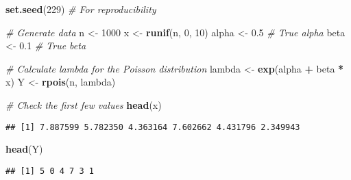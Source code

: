 \documentclass[
]{article}
\newenvironment{Shaded}{\begin{snugshade}}{\end{snugshade}}
\newcommand{\CommentTok}[1]{\textcolor[rgb]{0.56,0.35,0.01}{\textit{#1}}}
\newcommand{\DecValTok}[1]{\textcolor[rgb]{0.00,0.00,0.81}{#1}}
\newcommand{\FloatTok}[1]{\textcolor[rgb]{0.00,0.00,0.81}{#1}}
\newcommand{\FunctionTok}[1]{\textcolor[rgb]{0.13,0.29,0.53}{\textbf{#1}}}
\newcommand{\NormalTok}[1]{#1}
\newcommand{\OtherTok}[1]{\textcolor[rgb]{0.56,0.35,0.01}{#1}}
\newcommand{\SpecialCharTok}[1]{\textcolor[rgb]{0.81,0.36,0.00}{\textbf{#1}}}
\begin{document}
\begin{Shaded}
\begin{Highlighting}[]
\FunctionTok{set.seed}\NormalTok{(}\DecValTok{229}\NormalTok{) }\CommentTok{\# For reproducibility}

\CommentTok{\# Generate  data}
\NormalTok{n }\OtherTok{\textless{}{-}} \DecValTok{1000} 
\NormalTok{x }\OtherTok{\textless{}{-}} \FunctionTok{runif}\NormalTok{(n, }\DecValTok{0}\NormalTok{, }\DecValTok{10}\NormalTok{) }
\NormalTok{alpha }\OtherTok{\textless{}{-}} \FloatTok{0.5} \CommentTok{\# True alpha}
\NormalTok{beta }\OtherTok{\textless{}{-}} \FloatTok{0.1} \CommentTok{\# True beta}

\CommentTok{\# Calculate lambda for the Poisson distribution}
\NormalTok{lambda }\OtherTok{\textless{}{-}} \FunctionTok{exp}\NormalTok{(alpha }\SpecialCharTok{+}\NormalTok{ beta }\SpecialCharTok{*}\NormalTok{ x)}
\NormalTok{Y }\OtherTok{\textless{}{-}} \FunctionTok{rpois}\NormalTok{(n, lambda)}

\CommentTok{\# Check the first few values}
\FunctionTok{head}\NormalTok{(x)}
\end{Highlighting}
\end{Shaded}

\begin{verbatim}
## [1] 7.887599 5.782350 4.363164 7.602662 4.431796 2.349943
\end{verbatim}

\begin{Shaded}
\begin{Highlighting}[]
\FunctionTok{head}\NormalTok{(Y)}
\end{Highlighting}
\end{Shaded}

\begin{verbatim}
## [1] 5 0 4 7 3 1
\end{verbatim}
\end{document}
